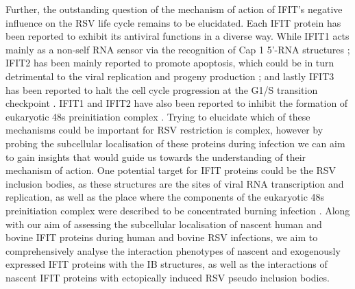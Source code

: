 Further, the outstanding question of the mechanism of action of IFIT's negative influence on the RSV life cycle remains to be elucidated. Each IFIT protein has been reported to exhibit its antiviral functions in a diverse way. While IFIT1 acts mainly as a non-self RNA sensor via the recognition of Cap 1 5'-RNA structures \cite{Mears2018BetterResponse}; IFIT2 has been mainly reported to promote apoptosis, which could be in turn detrimental to the viral replication and progeny production \cite{Chen2017InhibitionApoptosis}; and lastly IFIT3 has been reported to halt the cell cycle progression at the G1/S transition checkpoint \cite{Xiao2006RIG-GProteins}. IFIT1 and IFIT2 have also been reported to inhibit the formation of eukaryotic 48s preinitiation complex \cite{Diamond2014IFIT1:Translation, Guo2000CharacterizationVirus}. Trying to elucidate which of these mechanisms could be important for RSV restriction is complex, however by probing the subcellular localisation of these proteins during infection we can aim to gain insights that would guide us towards the understanding of their mechanism of action. One potential target for IFIT proteins could be the RSV inclusion bodies, as these structures are the sites of viral RNA transcription and replication, as well as the place where the components of the eukaryotic 48s preinitiation complex were described to be concentrated burning infection \cite{Rincheval2017FunctionalVirus, Jobe2020RespiratorySignaling, Jobe2023ViralCondensates}. Along with our aim of assessing the subcellular localisation of nascent human and bovine IFIT proteins during human and bovine RSV infections, we aim to comprehensively analyse the interaction phenotypes of nascent and exogenously expressed IFIT proteins with the IB structures, as well as the interactions of nascent IFIT proteins with ectopically induced RSV pseudo inclusion bodies.

